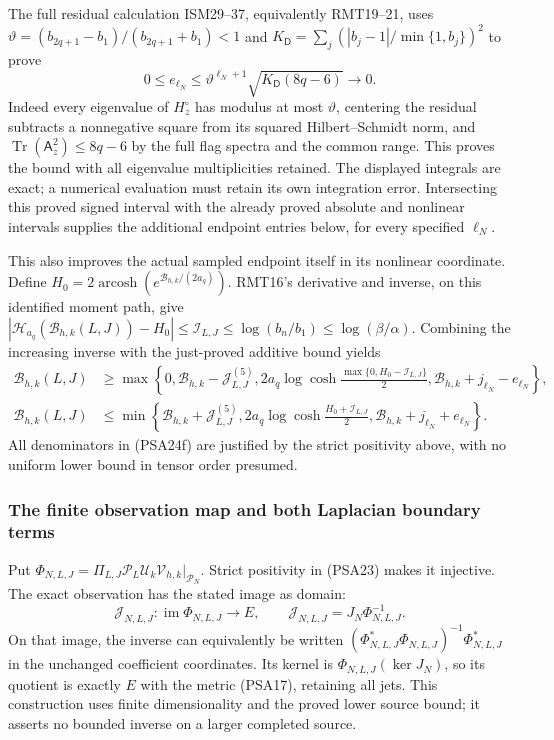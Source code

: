 The full residual calculation ISM29--37, equivalently RMT19--21,
uses
$\vartheta=(b_{2q+1}-b_1)/(b_{2q+1}+b_1)<1$ and
$K_{\mathsf D}=\sum_j(|b_j-1|/\min\{1,b_j\})^2$ to prove
\[
 0\le e_{\ell_N}\le
    \vartheta^{\ell_N+1}\sqrt{K_{\mathsf D}(8q-6)}
       \longrightarrow0.
 \tag{PSA25bc}
\]
Indeed every eigenvalue of $H_z^\circ$ has modulus at most
$\vartheta$, centering the residual subtracts a nonnegative square
from its squared Hilbert--Schmidt norm, and
$\operatorname{Tr}(\mathsf A_z^2)\le8q-6$ by the full flag spectra
and the common range. This proves the bound with all eigenvalue
multiplicities retained. The displayed integrals are exact; a
numerical evaluation must retain its own integration error.
Intersecting this proved signed interval with the already proved
absolute and nonlinear intervals supplies the additional endpoint
entries below, for every specified $\ell_N$.

This also improves the actual sampled endpoint itself in its
nonlinear coordinate. Define
$H_0=2\operatorname{arcosh}(e^{\mathcal B_{h,k}/(2a_q)})$.
RMT16's derivative and inverse, on this identified moment path,
give $|\mathscr H_{a_q}(\mathcal B_{h,k}(L,J))-H_0|
\le\mathcal I_{L,J}\le\log(b_n/b_1)\le\log(\beta/\alpha)$.
Combining the increasing inverse with the just-proved additive
bound yields
\[
 \begin{aligned}
 \mathcal B_{h,k}(L,J)&\ge\max\left\{0,
 \mathcal B_{h,k}-\mathcal J^{(5)}_{L,J},
 2a_q\log\cosh\frac{\max\{0,H_0-\mathcal I_{L,J}\}}2,
\mathcal B_{h,k}+j_{\ell_N}-e_{\ell_N}\right\},\\
 \mathcal B_{h,k}(L,J)&\le\min\left\{
 \mathcal B_{h,k}+\mathcal J^{(5)}_{L,J},
 2a_q\log\cosh\frac{H_0+\mathcal I_{L,J}}2,
\mathcal B_{h,k}+j_{\ell_N}+e_{\ell_N}\right\}.
 \end{aligned}
 \tag{PSA25a}
\]
All denominators in (PSA24f) are justified by the strict positivity
above, with no uniform lower bound in tensor order presumed.

\subsubsection{The finite observation map and both Laplacian boundary terms}

Put $\Phi_{N,L,J}=\Pi_{L,J}\mathcal P_L\mathcal U_k
\mathcal V_{h,k}|_{\mathcal P_N}$. Strict positivity in (PSA23)
makes it injective. The exact observation has the stated image as
domain:
\[
 \mathcal J_{N,L,J}:\operatorname{im}\Phi_{N,L,J}\longrightarrow E,
 \qquad
 \mathcal J_{N,L,J}=J_N\Phi_{N,L,J}^{-1}.
 \tag{PSA26}
\]
On that image, the inverse can equivalently be written
$(\Phi_{N,L,J}^*\Phi_{N,L,J})^{-1}\Phi_{N,L,J}^*$ in the unchanged
coefficient coordinates. Its kernel is
$\Phi_{N,L,J}(\ker J_N)$, so its quotient is exactly $E$ with the
metric (PSA17), retaining all jets. This construction uses finite
dimensionality and the proved lower source bound; it asserts no
bounded inverse on a larger completed source.

